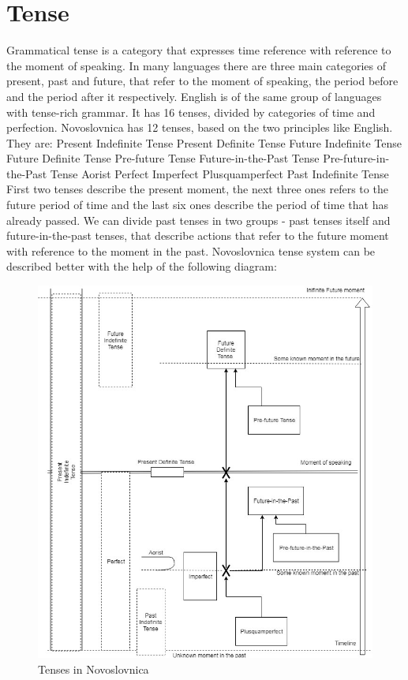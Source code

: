 \section{Tense}

Grammatical tense is a category that expresses time reference with reference to the moment of speaking. In many languages there are three main categories of present, past and future, that refer to the moment of speaking, the period before and the period after it respectively. English is of the same group of languages with tense-rich grammar. It has 16 tenses, divided by categories of time and perfection. Novoslovnica has 12 tenses, based on the two principles like English. They are:
Present Indefinite Tense
Present Definite Tense
Future Indefinite Tense
Future Definite Tense
Pre-future Tense
Future-in-the-Past Tense
Pre-future-in-the-Past Tense
Aorist
Perfect
Imperfect
Plusquamperfect
Past Indefinite Tense
First two tenses describe the present moment, the next three ones refers to the future period of time and the last six ones describe the period of time that has already passed.
We can divide past tenses in two groups - past tenses itself and future-in-the-past tenses, that describe actions that refer to the future moment with reference to the moment in the past.
Novoslovnica tense system can be described better with the help of the following diagram:

\begin{figure}
	\includegraphics[width=\linewidth]{./sources/tenses.jpg}
	\caption{Tenses in Novoslovnica}
	\label{fig:tenses}
\end{figure}

